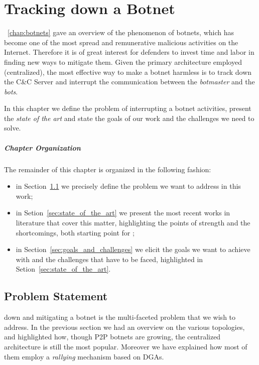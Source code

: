 
\chapter{Tracking down a Botnet} %
\label{chap:motivation}
~\ref{chap:botnets} gave an overview of
the phenomenon of botnets, which has become one of the most spread and remunerative
malicious activities on the Internet. Therefore it is of great interest for defenders to invest time and labor in finding new ways to mitigate them.
Given the primary architecture employed (centralized), the most effective way
to make a botnet harmless is to track down the C\&C Server and interrupt the
communication between the \emph{botmaster} and the \emph{bots}.

In this chapter we define the problem of interrupting a botnet
activities, present the \emph{state of the art} and
state the goals of our work  and the challenges we need to solve.

\paragraph{Chapter Organization} The remainder of this chapter is organized in the
following fashion:
\begin{itemize}
    \item in Section~\ref{sec:problem_statement} we precisely define the problem
        we want to address in this work;
    \item in Setion~\ref{sec:state_of_the_art} we present the most recent
        works in literature that cover this matter, highlighting the points
        of strength and the shortcomings, both starting point for \thesystem;
    \item in Section~\ref{sec:goals_and_challenges} we  elicit the goals we want
    to achieve with \thesystem and the challenges that have to be faced,
        highlighted in Setion~\ref{sec:state_of_the_art}.
\end{itemize}

\newpage

\section{Problem Statement} %
\label{sec:problem_statement}
 down and mitigating a botnet is the multi-faceted problem
that we wish to address. In the previous section we had an overview on the various
topologies, and highlighted how, though P2P botnets are growing, the centralized
architecture is still the most popular. Moreover we have explained how most of
them employ a \emph{rallying} mechanism based on DGAs.

